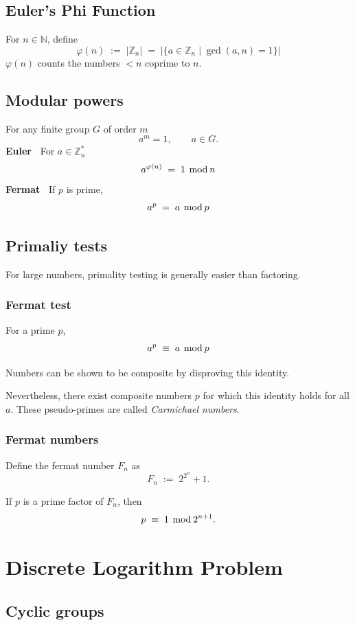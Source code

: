 \documentclass[a4paper]{scrartcl}
\newcommand\abs[1]{\left| #1 \right|}
\newcommand\N{\mathbb N}
\newcommand\Z{\mathbb Z}
\renewcommand\mod{\hspace*{0.4em}\mathrm{mod}\hspace*{0.2em}}
\newcommand\linetag[1]{\textbf{\sffamily#1\;\ }}
\begin{document}
\subsection{Euler's Phi Function}

\begin{samepage}
For $n\in\N$, define
\[\varphi(n)\;:=\;\abs{\Z_n}\;=\;\abs{\{a\in\Z_n\mid\gcd(a,n)=1\}}\]
$\varphi(n)$ counts the numbers $<n$ coprime to $n$.
\end{samepage}

\subsection{Modular powers}

For any finite group $G$ of order $m$ \[a^m=1,\qquad a\in G.\]
\linetag{Euler} For $a\in\Z^*_n$ \[a^{\varphi(n)}\;=\;1\mod n\]
\linetag{Fermat} If $p$ is prime, \[a^p\;=\;a\mod p\]

\subsection{Primaliy tests}

For large numbers, primality testing is generally easier than factoring.

\subsubsection{Fermat test}
For a prime $p$,
\[a^p\;\equiv\; a\mod p\]

Numbers can be shown to be composite by disproving this identity.

Nevertheless, there exist composite numbers $p$ for which this identity holds for all $a$. These pseudo-primes are called \textit{Carmichael numbers}.

\subsubsection{Fermat numbers}

Define the fermat number $F_n$ as \[F_n\;:=\;2^{2^n}+1.\]

If $p$ is a prime factor of $F_n$, then \[p\;\equiv\;1\mod 2^{n+1}.\]

\section{Discrete Logarithm Problem}

\subsection{Cyclic groups}
\end{document}
